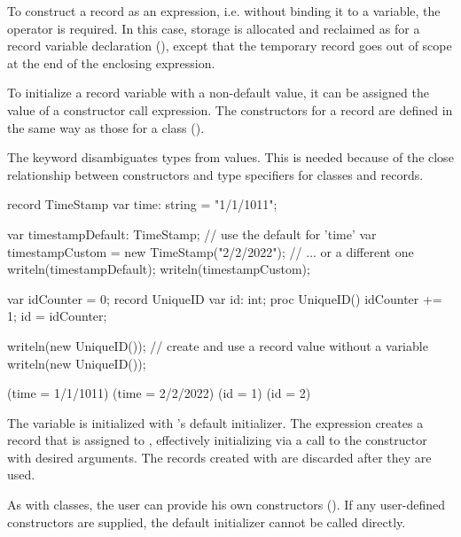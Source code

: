 To construct a record as an expression,
i.e. without binding it to a variable, the  operator is
required.  In this case, storage is allocated and reclaimed as for a record
variable declaration (), except that the temporary record
goes out of scope at the end of the enclosing expression.

To initialize a record variable with a non-default value, it can be assigned
the value of a constructor call expression.  The constructors for a record are
defined in the same way as those for a class ().

\begin{rationale}
The  keyword disambiguates types from values. This is needed because of the close
relationship between constructors and type specifiers for classes and
records.
\end{rationale}

\begin{example}
\begin{chapelpre}
\end{chapelpre}
\begin{chapel}
record TimeStamp {
  var time: string = "1/1/1011";
}

var timestampDefault: TimeStamp;                  // use the default for 'time'
var timestampCustom = new TimeStamp("2/2/2022");  // ... or a different one
writeln(timestampDefault);
writeln(timestampCustom);

var idCounter = 0;
record UniqueID {
  var id: int;
  proc UniqueID() { idCounter += 1; id = idCounter; }
}

writeln(new UniqueID());  // create and use a record value without a variable
writeln(new UniqueID());
\end{chapel}
\begin{chapeloutput}
(time = 1/1/1011)
(time = 2/2/2022)
(id = 1)
(id = 2)
\end{chapeloutput}
The variable  is initialized with 's
default initializer. The  expression creates a record that is assigned to , effectively initializing  via a call to the constructor with desired arguments. The records created with  are discarded after they are used.
\end{example}

As with classes, the user can provide his own constructors
().  If any user-defined constructors are
supplied, the default initializer cannot be called directly.  

